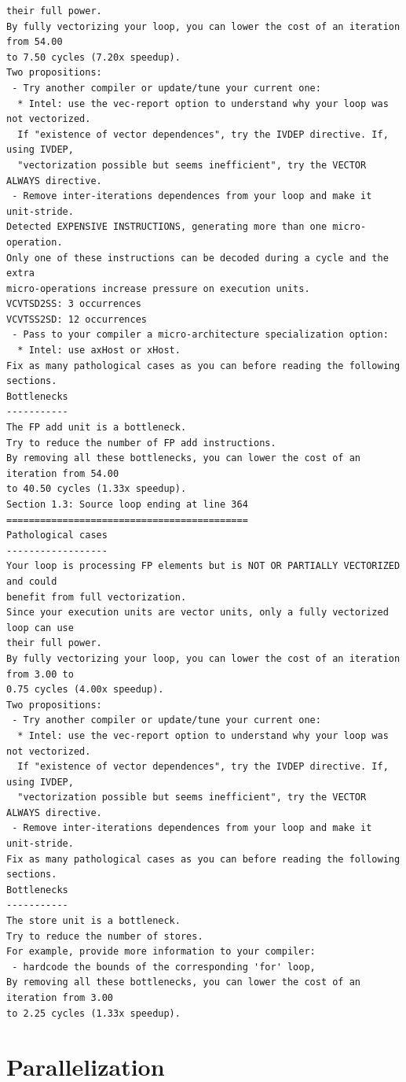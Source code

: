 \documentclass[12pt]{article}
\numberwithin{equation}{section}
\begin{document}
{\begin{verbatim}
their full power.
By fully vectorizing your loop, you can lower the cost of an iteration from 54.00
to 7.50 cycles (7.20x speedup).
Two propositions:
 - Try another compiler or update/tune your current one:
  * Intel: use the vec-report option to understand why your loop was not vectorized.
  If "existence of vector dependences", try the IVDEP directive. If, using IVDEP,
  "vectorization possible but seems inefficient", try the VECTOR ALWAYS directive.
 - Remove inter-iterations dependences from your loop and make it unit-stride.
Detected EXPENSIVE INSTRUCTIONS, generating more than one micro-operation.
Only one of these instructions can be decoded during a cycle and the extra
micro-operations increase pressure on execution units.
VCVTSD2SS: 3 occurrences
VCVTSS2SD: 12 occurrences
 - Pass to your compiler a micro-architecture specialization option:
  * Intel: use axHost or xHost.
Fix as many pathological cases as you can before reading the following sections.
Bottlenecks
-----------
The FP add unit is a bottleneck.
Try to reduce the number of FP add instructions.
By removing all these bottlenecks, you can lower the cost of an iteration from 54.00
to 40.50 cycles (1.33x speedup).
Section 1.3: Source loop ending at line 364
===========================================
Pathological cases
------------------
Your loop is processing FP elements but is NOT OR PARTIALLY VECTORIZED and could
benefit from full vectorization.
Since your execution units are vector units, only a fully vectorized loop can use
their full power.
By fully vectorizing your loop, you can lower the cost of an iteration from 3.00 to
0.75 cycles (4.00x speedup).
Two propositions:
 - Try another compiler or update/tune your current one:
  * Intel: use the vec-report option to understand why your loop was not vectorized.
  If "existence of vector dependences", try the IVDEP directive. If, using IVDEP,
  "vectorization possible but seems inefficient", try the VECTOR ALWAYS directive.
 - Remove inter-iterations dependences from your loop and make it unit-stride.
Fix as many pathological cases as you can before reading the following sections.
Bottlenecks
-----------
The store unit is a bottleneck.
Try to reduce the number of stores.
For example, provide more information to your compiler:
 - hardcode the bounds of the corresponding 'for' loop,
By removing all these bottlenecks, you can lower the cost of an iteration from 3.00
to 2.25 cycles (1.33x speedup).
\end{verbatim}
}




\section{Parallelization}
\end{document}
